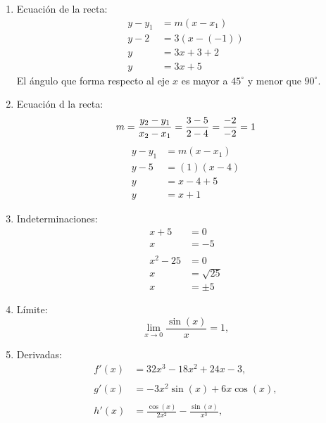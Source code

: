 \documentclass[]{article}
\begin{document}
\begin{enumerate}
\item Ecuaci\'on de la recta:
\begin{align*}
y - y_{1} &= m (x - x_{1}) \\
y - 2 &= 3(x - (-1)) \\
y &= 3x +3 +2 \\
y &= 3x +5
\end{align*}
El \'angulo que forma respecto al eje $x$ es mayor a $45^{\circ}$ y menor que
$90^{\circ}$.

\item Ecuaci\'on d la recta:
\begin{equation*}
m = \frac{y_{2} - y_{1}}{x_{2}-x_{1}} = \frac{ 3 - 5}{2 - 4} = \frac{-2}{-2} = 1 \\ \\
\end{equation*}
\begin{align*}
y - y_{1} &= m (x - x_{1}) \\
y - 5 &= (1) (x - 4) \\
y &= x - 4 +5 \\
y &= x+1
\end{align*}

\item Indeterminaciones:
\begin{align}
x+5 &= 0 \nonumber \\  
x&=-5 \\ \nonumber \\
x^{2}-25 &= 0 \nonumber \\
x &= \sqrt{25} \nonumber\\
x &= \pm 5
\end{align}
\setcounter{equation}{0}

\item L\'imite:
\begin{equation*}
\lim_{x \to 0} \frac{\sin(x)}{x} = 1,
\end{equation*} 

\item Derivadas:
\begin{align}
f'(x) &= 32x^{3} - 18x^{2} + 24x -3, \\ \nonumber \\
g'(x) &= -3x^{2}\sin(x) + 6x\cos(x) , \\ \nonumber \\
h'(x) &= \frac{\cos(x)}{2x^2} - \frac{\sin(x)}{x^{3}}, \\ \nonumber
\end{align}
\setcounter{equation}{0}


\end{enumerate}
\end{document}

